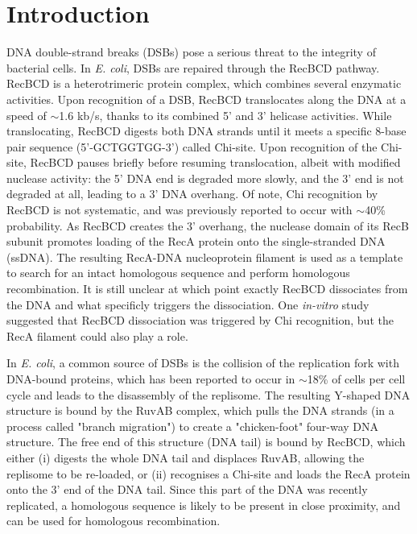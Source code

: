 \section*{Introduction}

DNA double-strand breaks (DSBs) pose a serious threat to the integrity of bacterial cells.
In \emph{E. coli}, DSBs are repaired through the RecBCD pathway. RecBCD is a heterotrimeric protein complex, which combines several enzymatic activities\cite{Dillingham2008}. Upon recognition of a DSB, RecBCD translocates along the DNA at a speed of $\sim$1.6 kb/s, thanks to its combined 5' and 3' helicase activities\cite{Wiktor2018}. While translocating, RecBCD digests both DNA strands until it meets a specific 8-base pair sequence (5'-GCTGGTGG-3') called Chi-site. Upon recognition of the Chi-site, RecBCD pauses briefly before resuming translocation, albeit with modified nuclease activity: the 5' DNA end is degraded more slowly, and the 3' end is not degraded at all, leading to a 3' DNA overhang. Of note, Chi recognition by RecBCD is not systematic, and was previously reported to occur with $\sim$40\% probability\cite{Taylor1992,Cockram2015}. As RecBCD creates the 3' overhang, the nuclease domain of its RecB subunit promotes loading of the RecA protein onto the single-stranded DNA (ssDNA)\cite{Churchill2000, Spies2006}. The resulting RecA-DNA nucleoprotein filament is used as a template to search for an intact homologous sequence and perform homologous recombination. It is still unclear at which point exactly RecBCD dissociates from the DNA and what specificly triggers the dissociation. One \emph{in-vitro} study suggested that RecBCD dissociation was triggered by Chi recognition\cite{Taylor1999}, but the RecA filament could also play a role.

In \emph{E. coli}, a common source of DSBs is the collision of the replication fork with DNA-bound proteins, which has been reported to occur in $\sim$18\% of cells per cell cycle\cite{Sinha2018} and leads to the disassembly of the replisome\cite{Michel1997}. The resulting Y-shaped DNA structure is bound by the RuvAB complex, which pulls the DNA strands (in a process called "branch migration") to create a "chicken-foot" four-way DNA structure\cite{Seigneur1998}. The free end of this structure (DNA tail) is bound by RecBCD, which either (i) digests the whole DNA tail and displaces RuvAB, allowing the replisome to be re-loaded, or (ii) recognises a Chi-site and loads the RecA protein onto the 3' end of the DNA tail\cite{Michel2001}. Since this part of the DNA was recently replicated, a homologous sequence is likely to be present in close proximity, and can be used for homologous recombination.

